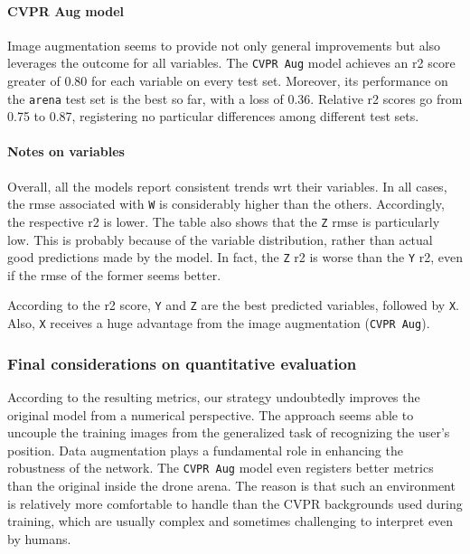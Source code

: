\paragraph*{CVPR Aug model}

Image augmentation seems to provide not only general improvements but also leverages the outcome for all variables. The \texttt{CVPR Aug} model achieves an \gls{r2} score greater of 0.80 for each variable on every test set. Moreover, its performance on the \texttt{arena} test set is the best so far, with a loss of 0.36. Relative \gls{r2} scores go from 0.75 to 0.87, registering no particular differences among different test sets.

\paragraph*{Notes on variables}

Overall, all the models report consistent trends \gls{wrt} their variables. In all cases, the \gls{rmse} associated with \texttt{W} is considerably higher than the others. Accordingly, the respective \gls{r2} is lower. The table also shows that the \texttt{Z} \gls{rmse} is particularly low. This is probably because of the variable distribution, rather than actual good predictions made by the model. In fact, the \texttt{Z} \gls{r2} is worse than the \texttt{Y} \gls{r2}, even if the \gls{rmse} of the former seems better.

According to the \gls{r2} score, \texttt{Y} and \texttt{Z} are the best predicted variables, followed by \texttt{X}. Also, \texttt{X} receives a huge advantage from the image augmentation (\texttt{CVPR Aug}). 

\subsubsection*{Final considerations on quantitative evaluation}

According to the resulting metrics, our strategy undoubtedly improves the original model from a numerical perspective. The approach seems able to uncouple the training images from the generalized task of recognizing the user's position. Data augmentation plays a fundamental role in enhancing the robustness of the network. The \texttt{CVPR Aug} model even registers better metrics than the original inside the drone arena. The reason is that such an environment is relatively more comfortable to handle than the CVPR backgrounds used during training, which are usually complex and sometimes challenging to interpret even by humans.


